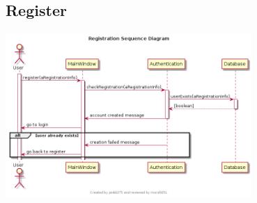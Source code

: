 \documentclass[11pt]{report}
\begin{document}
    \subsection{Register}
        \begin{minipage}{1\textwidth}
            \begin{center}
                \includegraphics[width=0.7\textwidth]{diagrams/sequence-authentication-register}
            \end{center}
        \end{minipage}
    
\end{document}
